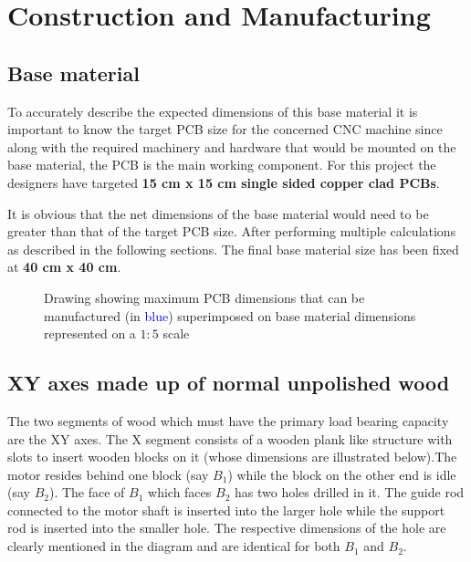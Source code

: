 \chapter{Construction and Manufacturing} \label{chapter3}

\section{Base material} \label{bmaterial}

To accurately describe the expected dimensions of this base material it is important to know the target PCB size for the concerned CNC machine since along with the required machinery and hardware that would be mounted on the base material, the PCB is the main working component. For this project the designers have targeted \textbf{15 cm x 15 cm single sided copper clad PCBs}. \par

It is obvious that the net dimensions of the base material would need to be greater than that of the target PCB size. After performing multiple calculations as described in the following sections. The final base material size has been fixed at \textbf{40 cm x 40 cm}.

\begin{figure}[h]
    \centering
    \caption{Drawing showing maximum PCB dimensions that can be manufactured (in \textcolor{blue}{blue}) superimposed on base material dimensions represented on a $1:5$ scale}
    \label{fig:base}
\end{figure}


\section{XY axes made up of normal unpolished wood}

The two segments of wood which must have the primary load bearing capacity are the XY axes. The X segment consists of a wooden plank like structure with slots to insert wooden blocks on it (whose dimensions are illustrated below).The motor resides behind one block (say $B_{1}$) while the block on the other end is idle (say $B_{2}$). The face of $B_{1}$ which faces $B_{2}$ has two holes drilled in it. The guide rod connected to the motor shaft is inserted into the larger hole while the support rod is inserted into the smaller hole. The respective dimensions of the hole are clearly mentioned in the diagram and are identical for both $B_{1}$ and $B_{2}$. \par


